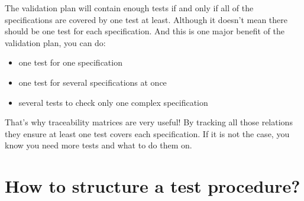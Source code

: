 The validation plan will contain enough tests if and only if all of the specifications are covered by one test at least. Although it doesn’t mean there should be one test for each specification. And this is one major benefit of the validation plan, you can do:

\begin{itemize}
    \item one test for one specification
    \item one test for several specifications at once
    \item several tests to check only one complex specification
\end{itemize}

That’s why traceability matrices are very useful! By tracking all those relations they ensure at least one test covers each specification. If it is not the case, you know you need more tests and what to do them on.

\section{How to structure a test procedure?}
